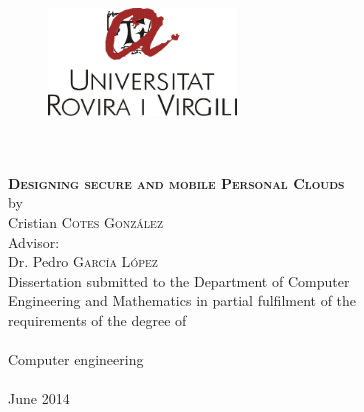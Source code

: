 \begin{titlepage}
\begin{center}
\begin{figure}
	\begin{center}
		\includegraphics[width=5cm]{figures/urv-logo.png}
	\end{center}
\end{figure}
\vspace*{0.3cm}
 \\
\vspace*{0.1cm}
 \\
\vspace*{1.3cm}
\noindent \LARGE \textbf{\textsc{Designing secure and mobile Personal Clouds}}\\
\vspace*{0.4cm}
\noindent \large {by\\}
\noindent \LARGE Cristian \textsc{Cotes Gonz{\'a}lez} \\
\vspace*{1.3cm}
\noindent \Large {Advisor:} \\
\noindent \Large Dr. Pedro \textsc{Garc{\'i}a L{\'o}pez}\\
\vspace*{3.0cm}
\noindent \large Dissertation submitted to the Department of Computer \\
\noindent \large Engineering and Mathematics in partial fulfilment of the  \\
\noindent \large requirements of the degree of \\[0.5cm]
\noindent \large \\ Computer engineering 
\\[1cm]
\noindent \large \\ June 2014
\vspace*{0.5cm}

\end{center}





\end{titlepage}
\sloppy

\titlepage
